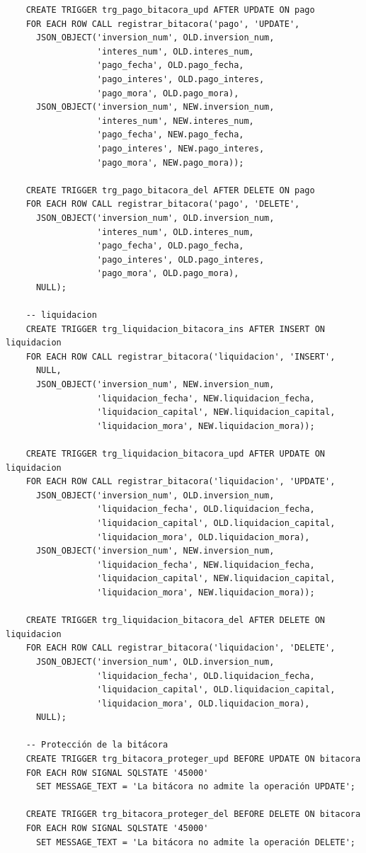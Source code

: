 \begin{verbatim}
	CREATE TRIGGER trg_pago_bitacora_upd AFTER UPDATE ON pago
	FOR EACH ROW CALL registrar_bitacora('pago', 'UPDATE',
	  JSON_OBJECT('inversion_num', OLD.inversion_num,
	              'interes_num', OLD.interes_num,
	              'pago_fecha', OLD.pago_fecha,
	              'pago_interes', OLD.pago_interes,
	              'pago_mora', OLD.pago_mora),
	  JSON_OBJECT('inversion_num', NEW.inversion_num,
	              'interes_num', NEW.interes_num,
	              'pago_fecha', NEW.pago_fecha,
	              'pago_interes', NEW.pago_interes,
	              'pago_mora', NEW.pago_mora));

	CREATE TRIGGER trg_pago_bitacora_del AFTER DELETE ON pago
	FOR EACH ROW CALL registrar_bitacora('pago', 'DELETE',
	  JSON_OBJECT('inversion_num', OLD.inversion_num,
	              'interes_num', OLD.interes_num,
	              'pago_fecha', OLD.pago_fecha,
	              'pago_interes', OLD.pago_interes,
	              'pago_mora', OLD.pago_mora),
	  NULL);

	-- liquidacion
	CREATE TRIGGER trg_liquidacion_bitacora_ins AFTER INSERT ON liquidacion
	FOR EACH ROW CALL registrar_bitacora('liquidacion', 'INSERT',
	  NULL,
	  JSON_OBJECT('inversion_num', NEW.inversion_num,
	              'liquidacion_fecha', NEW.liquidacion_fecha,
	              'liquidacion_capital', NEW.liquidacion_capital,
	              'liquidacion_mora', NEW.liquidacion_mora));

	CREATE TRIGGER trg_liquidacion_bitacora_upd AFTER UPDATE ON liquidacion
	FOR EACH ROW CALL registrar_bitacora('liquidacion', 'UPDATE',
	  JSON_OBJECT('inversion_num', OLD.inversion_num,
	              'liquidacion_fecha', OLD.liquidacion_fecha,
	              'liquidacion_capital', OLD.liquidacion_capital,
	              'liquidacion_mora', OLD.liquidacion_mora),
	  JSON_OBJECT('inversion_num', NEW.inversion_num,
	              'liquidacion_fecha', NEW.liquidacion_fecha,
	              'liquidacion_capital', NEW.liquidacion_capital,
	              'liquidacion_mora', NEW.liquidacion_mora));

	CREATE TRIGGER trg_liquidacion_bitacora_del AFTER DELETE ON liquidacion
	FOR EACH ROW CALL registrar_bitacora('liquidacion', 'DELETE',
	  JSON_OBJECT('inversion_num', OLD.inversion_num,
	              'liquidacion_fecha', OLD.liquidacion_fecha,
	              'liquidacion_capital', OLD.liquidacion_capital,
	              'liquidacion_mora', OLD.liquidacion_mora),
	  NULL);

	-- Protección de la bitácora
	CREATE TRIGGER trg_bitacora_proteger_upd BEFORE UPDATE ON bitacora
	FOR EACH ROW SIGNAL SQLSTATE '45000'
	  SET MESSAGE_TEXT = 'La bitácora no admite la operación UPDATE';

	CREATE TRIGGER trg_bitacora_proteger_del BEFORE DELETE ON bitacora
	FOR EACH ROW SIGNAL SQLSTATE '45000'
	  SET MESSAGE_TEXT = 'La bitácora no admite la operación DELETE';
\end{verbatim}

